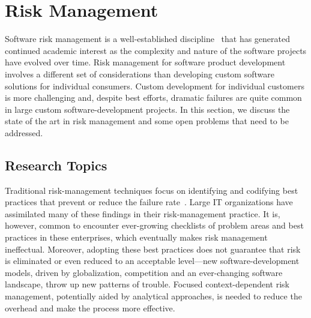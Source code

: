 \section{Risk Management}
\label{sec:risk}

Software risk management is a well-established discipline~\cite{risk1,risk2}
that has generated continued academic interest as the complexity and nature of
the software projects have evolved over time. Risk management for software
product development involves a different set of considerations than developing
custom software solutions for individual consumers. Custom development for
individual customers is more challenging and, despite best efforts, dramatic
failures are quite common in large custom software-development projects. In this
section, we discuss the state of the art in risk management and some open
problems that need to be addressed.

\subsection{Research Topics}

Traditional risk-management techniques focus on identifying and codifying best
practices that prevent or reduce the failure
rate~\cite{risk3,risk4,risk5}. Large IT organizations have assimilated many of
these findings in their risk-management practice.  It is, however, common to
encounter ever-growing checklists of problem areas and best practices in these
enterprises, which eventually makes risk management ineffectual. Moreover,
adopting these best practices does not guarantee that risk is eliminated or even
reduced to an acceptable level---new software-development models, driven by
globalization, competition and an ever-changing software landscape, throw up new
patterns of trouble. Focused context-dependent risk management, potentially
aided by analytical approaches, is needed to reduce the overhead and make the
process more effective.

